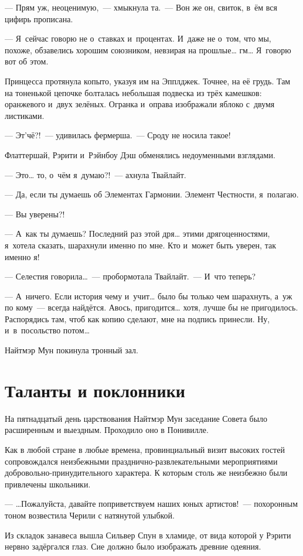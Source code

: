 \documentclass[twoside,a5paper,12pt]{extbook}
\begin{document}
— Прям уж, неоценимую, — хмыкнула та. — Вон же он, свиток, в ём вся цифирь прописана.

— Я сейчас говорю не о ставках и процентах. И даже не о том, что мы, похоже, обзавелись хорошим союзником, невзирая на прошлые… гм… Я говорю вот об этом.

Принцесса протянула копыто, указуя им на Эпплджек. Точнее, на её грудь. Там на тоненькой цепочке болталась небольшая подвеска из трёх камешков: оранжевого и двух зелёных. Огранка и оправа изображали яблоко с двумя листиками.

— Эт’чё?! — удивилась фермерша. — Сроду не носила такое!

Флаттершай, Рэрити и Рэйнбоу Дэш обменялись недоуменными взглядами.

— Это… то, о чём я думаю?! — ахнула Твайлайт.

— Да, если ты думаешь об Элементах Гармонии. Элемент Честности, я полагаю.

— Вы уверены?!

— А как ты думаешь? Последний раз этой дря… этими дрягоценностями, я хотела сказать, шарахнули именно по мне. Кто и может быть уверен, так именно я!

— Селестия говорила… — пробормотала Твайлайт. — И что теперь?

— А ничего. Если история чему и учит… было бы только чем шарахнуть, а уж по кому — всегда найдётся. Авось, пригодится… хотя, лучше бы не пригодилось. Распорядись там, чтоб как копию сделают, мне на подпись принесли. Ну, и в посольство потом…

Найтмэр Мун покинула тронный зал.


\chapter{Таланты и поклонники}

На пятнадцатый день царствования Найтмэр Мун заседание Совета было расширенным и выездным. Проходило оно в Понивилле.

Как в любой стране в любые времена, провинциальный визит высоких гостей сопровождался неизбежными праз\-дни\-чно-развлекательными мероприятиями добровольно-при\-ну\-ди\-тель\-ного характера. К которым столь же неизбежно были привлечены школьники.

— …Пожалуйста, давайте поприветствуем наших юных артистов! — похоронным тоном возвестила Черили с натянутой улыбкой.

Из складок занавеса вышла Сильвер Спун в хламиде, от вида которой у Рэрити нервно задёргался глаз. Сие должно было изображать древние одеяния.
\end{document}

